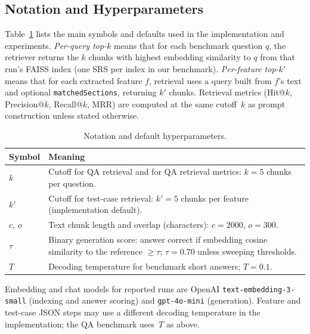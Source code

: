 \documentclass[conference]{IEEEtran}
\begin{document}

\subsection{Notation and Hyperparameters}
\label{sec:notation}

Table~\ref{tab:notation} lists the main symbols and defaults used in the implementation and experiments. \emph{Per-query top-$k$} means that for each benchmark question $q$, the retriever returns the $k$ chunks with highest embedding similarity to $q$ from that run's FAISS index (one SRS per index in our benchmark). \emph{Per-feature top-$k'$} means that for each extracted feature $f$, retrieval uses a query built from $f$'s text and optional \texttt{matchedSections}, returning $k'$ chunks. Retrieval metrics (Hit@$k$, Precision@$k$, Recall@$k$, MRR) are computed at the same cutoff~$k$ as prompt construction unless stated otherwise.

\begin{table}[t]
\centering
\caption{Notation and default hyperparameters.}
\label{tab:notation}
\begin{tabular}{@{}p{}p{}@{}}
\hline
Symbol & Meaning \\
\hline
$k$ & Cutoff for QA retrieval and for QA retrieval metrics: $k{=}5$ chunks per question. \\
$k'$ & Cutoff for test-case retrieval: $k'{=}5$ chunks per feature (implementation default). \\
$c$, $o$ & Text chunk length and overlap (characters): $c{=}2000$, $o{=}300$. \\
$\tau$ & Binary generation score: answer correct if embedding cosine similarity to the reference $\geq\tau$; $\tau{=}0.70$ unless sweeping thresholds. \\
$T$ & Decoding temperature for benchmark short answers; $T{=}0.1$. \\
\hline
\end{tabular}
\end{table}

Embedding and chat models for reported runs are OpenAI \texttt{text-embedding-3-small} (indexing and answer scoring) and \texttt{gpt-4o-mini} (generation). Feature and test-case JSON steps may use a different decoding temperature in the implementation; the QA benchmark uses~$T$ as above.
\end{document}
